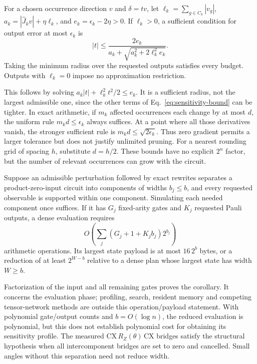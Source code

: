 \begin{corollary}
\label{cor:radius}
For a chosen occurrence direction $v$ and $\delta=t v$, let
$\ell_k=\sum_{g\in C_k}|v_g|$,
$a_k=|\widehat J_kv|+\eta\ell_k$, and
$e_k=\epsilon_k-2\eta>0$.
If $\ell_k>0$, a sufficient condition for output error at most $\epsilon_k$ is
\begin{equation}
 |t|\leq\frac{2e_k}{a_k+\sqrt{a_k^2+2\ell_k^2e_k}}.
 \label{eq:safe-radius}
\end{equation}
Taking the minimum radius over the requested outputs satisfies every budget. Outputs with $\ell_k=0$ impose no approximation restriction.
\end{corollary}

This follows by solving $a_k|t|+\ell_k^2t^2/2\leq e_k$. It is a sufficient radius, not the largest admissible one, since the other terms of Eq.~\eqref{eq:sensitivity-bound} can be tighter. In exact arithmetic, if $m_k$ affected occurrences each change by at most $d$, the uniform rule $m_kd\leq\epsilon_k$ always suffices. At a point where all those derivatives vanish, the stronger sufficient rule is $m_kd\leq\sqrt{2\epsilon_k}$. Thus zero gradient permits a larger tolerance but does not justify unlimited pruning. For a nearest rounding grid of spacing $h$, substitute $d=h/2$. These bounds have no explicit $2^n$ factor, but the number of relevant occurrences can grow with the circuit.

\begin{corollary}
\label{cor:resource-reduction}
Suppose an admissible perturbation followed by exact rewrites separates a product-zero-input circuit into components of widths $b_j\leq b$, and every requested observable is supported within one component. Simulating each needed component once suffices. If it has $G_j$ fixed-arity gates and $K_j$ requested Pauli outputs, a dense evaluation requires
\begin{equation}
 O\!\left(\sum_j (G_j+1+K_jb_j)2^{b_j}\right)
 \label{eq:reduced-work}
\end{equation}
arithmetic operations. Its largest state payload is at most $16\,2^b$ bytes, or a reduction of at least $2^{W-b}$ relative to a dense plan whose largest state has width $W\geq b$.
\end{corollary}

Factorization of the input and all remaining gates proves the corollary. It concerns the evaluation phase; profiling, search, resident memory and competing tensor-network methods are outside this operation/payload statement. With polynomial gate/output counts and $b=O(\log n)$, the reduced evaluation is polynomial, but this does not establish polynomial cost for obtaining its sensitivity profile. The measured $\mathrm{CX}\,R_Z(\theta)\,\mathrm{CX}$ bridges satisfy the structural hypothesis when all intercomponent bridges are set to zero and cancelled. Small angles without this separation need not reduce width.

